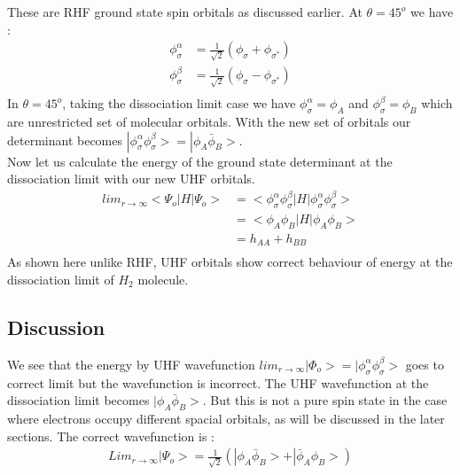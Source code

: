 \documentclass[11pt]{article}   	%
\begin{document}
	These are RHF ground state spin orbitals as discussed earlier. At $\theta=45^o$ we have :\\
	\begin{equation}
	\begin{split}
		\phi_{\sigma}^{\alpha}&=\frac{1}{\sqrt{2}}(\phi_{\sigma}+\phi_{\sigma^*})\\
		\phi_{\sigma}^{\beta}&=\frac{1}{\sqrt{2}}(\phi_{\sigma}-\phi_{\sigma^*})\\
	\end{split}
	\end{equation}
	In $\theta=45^o$, taking the dissociation limit case we have 
	$\phi_{\sigma}^{\alpha}=\phi_A$ and $\phi_{\sigma}^{\beta}=\phi_B$ which are unrestricted set of 
	molecular orbitals.
	With the new set of orbitals our determinant becomes $|\phi_{\sigma}^{\alpha}\phi_{\sigma}^{\beta}>
	=|\phi_A\bar{\phi}_B>$.\\ 
	Now let us calculate the energy of the ground state determinant at the dissociation limit with our new UHF orbitals. \\
	\begin{equation}
		\begin{split}
			lim_{r\rightarrow \infty}<\Psi_o|H|\Psi_o>&=<\phi_{\sigma}^{\alpha}
			\phi_{\sigma}^{\beta}|H|\phi_{\sigma}^{\alpha}\phi_{\sigma}^{\beta}>\\
				&=<\phi_A\phi_B|H|\phi_A\phi_B>\\
				&=h_{AA}+h_{BB}\\
		\end{split}
	\end{equation}
	As shown here unlike RHF, UHF orbitals show correct behaviour of energy at the dissociation 
	limit of $H_2$ molecule.\\
	\subsection{Discussion}
	We see that the energy by UHF wavefunction $lim_{r\rightarrow\infty}|\Phi_o>=|\phi_{\sigma}^{\alpha}\phi_{\sigma}^{\beta}>$ goes to
	correct limit but the wavefunction is incorrect. The UHF wavefunction at the dissociation limit
	 becomes $|\phi_A\bar{\phi}_B>$. But this is not a pure spin state in the case where electrons occupy
	 different spacial orbitals, as will be discussed in the 
	later sections. The correct wavefunction is :\\
	\begin{equation}
	\begin{split}
		Lim_{r\rightarrow\infty}|\Psi_o>=\frac{1}{\sqrt{2}}(|\phi_A\bar{\phi}_B>+|\bar{\phi}_A\phi_B>)
	\end{split}
	\end{equation}
\end{document}

